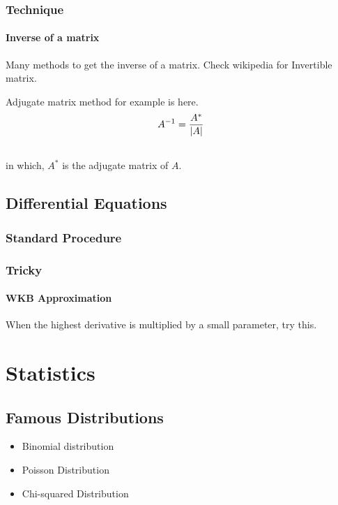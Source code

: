 \documentclass[letterpaper,10pt,english]{sphinxmanual}
\begin{document}
\subsubsection{Technique}
\label{math:technique}

\paragraph{Inverse of a matrix}
\label{math:inverse-of-a-matrix}
Many methods to get the inverse of a matrix. Check wikipedia for Invertible matrix.

Adjugate matrix method for example is here.
\begin{gather}
\begin{split}A^{-1} = \frac{A^*}{|A|}\end{split}\notag\\\begin{split}\end{split}\notag
\end{gather}
in which, $A^*$ is the adjugate matrix of $A$.


\subsection{Differential Equations}
\label{math:differential-equations}

\subsubsection{Standard Procedure}
\label{math:standard-procedure}

\subsubsection{Tricky}
\label{math:tricky}

\paragraph{WKB Approximation}
\label{math:wkb-approximation}
When the highest derivative is multiplied by a small parameter, try this.


\section{Statistics}
\label{Statistics/statistics:statistics}\label{Statistics/statistics::doc}

\subsection{Famous Distributions}
\label{Statistics/statistics:famous-distributions}\begin{itemize}
\item {} 
Binomial distribution

\item {} 
Poisson Distribution

\item {} 
Chi-squared Distribution

\end{itemize}
\end{document}
